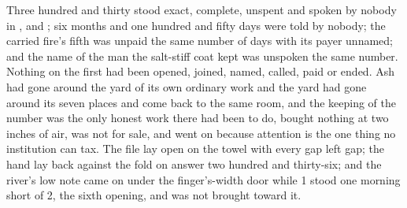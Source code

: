 Three hundred and thirty stood exact, complete, unspent and spoken by nobody in ,  and ; six months and one hundred and fifty days were told by nobody; the carried fire's fifth was unpaid the same number of days with its payer unnamed; and the name of the man the salt-stiff coat kept was unspoken the same number. Nothing on the first had been opened, joined, named, called, paid or ended. Ash had gone around the yard of its own ordinary work and the yard had gone around its seven places and come back to the same room, and the keeping of the number was the only honest work there had been to do, bought nothing at two inches of air, was not for sale, and went on because attention is the one thing no institution can tax. The file lay open on the towel with every gap left gap; the hand lay back against the fold on answer two hundred and thirty-six; and the river's low note came on under the finger's-width door while  1 stood one morning short of  2, the sixth opening, and was not brought toward it.
